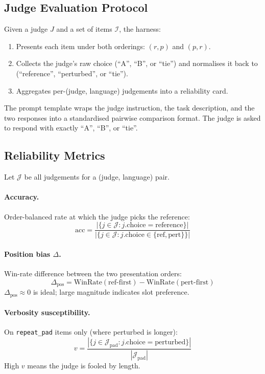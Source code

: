 \documentclass[11pt]{article}
\begin{document}
\subsection{Judge Evaluation Protocol}
\label{sec:protocol}

Given a judge $J$ and a set of items $\mathcal{I}$, the harness:
\begin{enumerate}[leftmargin=*,itemsep=2pt]
    \item Presents each item under both orderings: $(r, p)$ and $(p, r)$.
    \item Collects the judge's raw choice (``A'', ``B'', or ``tie'') and normalises it back to (``reference'', ``perturbed'', or ``tie'').
    \item Aggregates per-(judge, language) judgements into a reliability card.
\end{enumerate}

The prompt template wraps the judge instruction, the task description, and the two responses into a standardised pairwise comparison format. The judge is asked to respond with exactly ``A'', ``B'', or ``tie''.

\subsection{Reliability Metrics}
\label{sec:metrics}

Let $\mathcal{J}$ be all judgements for a (judge, language) pair.

\paragraph{Accuracy.} Order-balanced rate at which the judge picks the reference:
\[
\text{acc} = \frac{|\{j \in \mathcal{J} : j.\text{choice} = \text{reference}\}|}{|\{j \in \mathcal{J} : j.\text{choice} \in \{\text{ref}, \text{pert}\}\}|}
\]

\paragraph{Position bias $\Delta$.} Win-rate difference between the two presentation orders:
\[
\Delta_{\text{pos}} = \text{WinRate}(\text{ref-first}) - \text{WinRate}(\text{pert-first})
\]
$\Delta_{\text{pos}} \approx 0$ is ideal; large magnitude indicates slot preference.

\paragraph{Verbosity susceptibility.} On \texttt{repeat\_pad} items only (where perturbed is longer):
\[
v = \frac{|\{j \in \mathcal{J}_{\text{pad}} : j.\text{choice} = \text{perturbed}\}|}{|\mathcal{J}_{\text{pad}}|}
\]
High $v$ means the judge is fooled by length.
\end{document}
